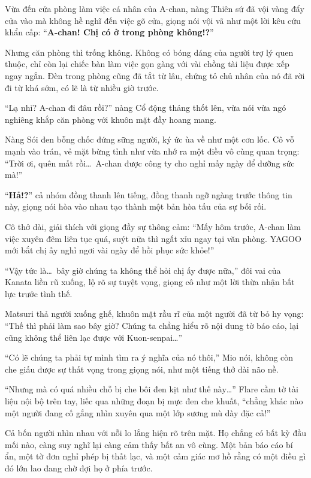 \documentclass[../main.tex]{subfiles}
\begin{document}
Vừa đến cửa phòng làm việc cá nhân của A-chan, nàng Thiên sứ đã vội vàng đẩy cửa vào mà không hề nghĩ đến việc gõ cửa, giọng nói vội vã như một lời kêu cứu khẩn cấp: ``\textbf{A-chan! Chị có ở trong phòng không!?}''

Nhưng căn phòng thì trống không. Không có bóng dáng của người trợ lý quen thuộc, chỉ còn lại chiếc bàn làm việc gọn gàng với vài chồng tài liệu được xếp ngay ngắn. Đèn trong phòng cũng đã tắt từ lâu, chứng tỏ chủ nhân của nó đã rời đi từ khá sớm, có lẽ là từ nhiều giờ trước.

``Lạ nhỉ? A-chan đi đâu rồi?'' nàng Cổ động thảng thốt lên, vừa nói vừa ngó nghiêng khắp căn phòng với khuôn mặt đầy hoang mang.

Nàng Sói đen bỗng chốc đứng sững người, ký ức ùa về như một cơn lốc. Cô vỗ mạnh vào trán, vẻ mặt bừng tỉnh như vừa nhớ ra một điều vô cùng quan trọng: ``Trời ơi, quên mất rồi\dots\ A-chan được công ty cho nghỉ mấy ngày để dưỡng sức mà!''

``\textbf{Hả!?}'' cả nhóm đồng thanh lên tiếng, đồng thanh ngỡ ngàng trước thông tin này, giọng nói hòa vào nhau tạo thành một bản hòa tấu của sự bối rối.

Cô thở dài, giải thích với giọng đầy sự thông cảm: ``Mấy hôm trước, A-chan làm việc xuyên đêm liên tục quá, suýt nữa thì ngất xỉu ngay tại văn phòng. YAGOO mới bắt chị ấy nghỉ ngơi vài ngày để hồi phục sức khỏe!''

``Vậy tức là\dots\ bây giờ chúng ta không thể hỏi chị ấy được nữa,'' đôi vai của Kanata liền rũ xuống, lộ rõ sự tuyệt vọng, giọng cô như một lời thừa nhận bất lực trước tình thế.

Matsuri thả người xuống ghế, khuôn mặt rầu rĩ của một người đã từ bỏ hy vọng: ``Thế thì phải làm sao bây giờ? Chúng ta chẳng hiểu rõ nội dung tờ báo cáo, lại cũng không thể liên lạc được với Kuon-senpai\dots''

``Có lẽ chúng ta phải tự mình tìm ra ý nghĩa của nó thôi,'' Mio nói, không còn che giấu được sự thất vọng trong giọng nói, như một tiếng thở dài não nề.

``Nhưng mà có quá nhiều chỗ bị che bôi đen kịt như thế này\dots'' Flare cầm tờ tài liệu nội bộ trên tay, liếc qua những đoạn bị mực đen che khuất, ``chẳng khác nào một người đang cố gắng nhìn xuyên qua một lớp sương mù dày đặc cả!''

Cả bốn người nhìn nhau với nỗi lo lắng hiện rõ trên mặt. Họ chẳng có bất kỳ đầu mối nào, càng suy nghĩ lại càng cảm thấy bất an vô cùng. Một bản báo cáo bí ẩn, một tờ đơn nghỉ phép bị thất lạc, và một cảm giác mơ hồ rằng có một điều gì đó lớn lao đang chờ đợi họ ở phía trước.
\end{document}
